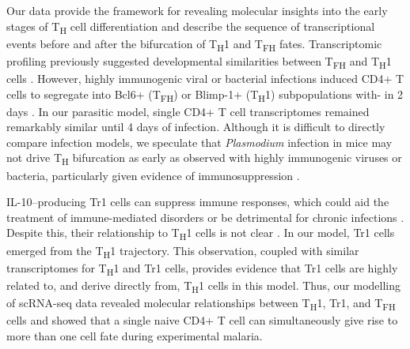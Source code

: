 Our data provide the framework for revealing molecular insights into the early stages of T\textsubscript{H} cell differentiation and describe the sequence of transcriptional events before and after the bifurcation of T\textsubscript{H}1 and T\textsubscript{FH} fates. Transcriptomic profiling previously suggested developmental similarities between T\textsubscript{FH} and T\textsubscript{H}1 cells \cite{Liu2012-vw}. However, highly immunogenic viral or bacterial infections induced CD4+ T cells to segregate into Bcl6+ (T\textsubscript{FH}) or Blimp-1+ (T\textsubscript{H}1) subpopulations with- in 2 days \cite{Choi2011-ym, Pepper2011-mm}. In our parasitic model, single CD4+ T cell transcriptomes remained remarkably similar until 4 days of infection. Although it is difficult to directly compare infection models, we speculate that \textit{Plasmodium} infection in mice may not drive T\textsubscript{H} bifurcation as early as observed with highly immunogenic viruses or bacteria, particularly given evidence of immunosuppression \cite{Haque2014-sq}.

IL-10–producing Tr1 cells can suppress immune responses, which could aid the treatment of immune-mediated disorders \cite{Clemente-Casares2016-pg} or be detrimental for chronic infections \cite{Couper2008-fc}. Despite this, their relationship to T\textsubscript{H}1 cells is not clear \cite{Apetoh2010-ri}. In our model, Tr1 cells emerged from the T\textsubscript{H}1 trajectory. This observation, coupled with similar transcriptomes for T\textsubscript{H}1 and Tr1 cells, provides evidence that Tr1 cells are highly related to, and derive directly from, T\textsubscript{H}1 cells in this model. Thus, our modelling of scRNA-seq data revealed molecular relationships between T\textsubscript{H}1, Tr1, and T\textsubscript{FH} cells and showed that a single naive CD4+ T cell can simultaneously give rise to more than one cell fate during experimental malaria.

